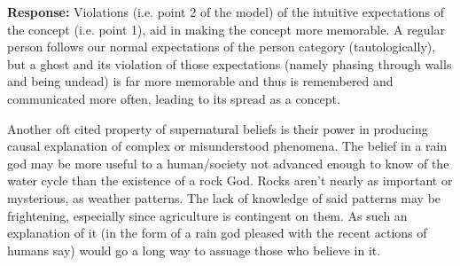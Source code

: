 \documentclass{article}
\begin{document}
\noindent\textbf{Response:} Violations (i.e. point 2 of the model) of the intuitive expectations of the concept (i.e. point 1), aid in making the concept more memorable. A regular person follows our normal expectations of the person category (tautologically), but a ghost and its violation of those expectations (namely phasing through walls and being undead) is far more memorable and thus is remembered and communicated more often, leading to its spread as a concept.

Another oft cited property of supernatural beliefs is their power in producing causal explanation of complex or misunderstood phenomena. The belief in a rain god may be more useful to a human/society not advanced enough to know of the water cycle than the existence of a rock God. Rocks aren't nearly as important or mysterious, as weather patterns. The lack of knowledge of said patterns may be frightening, especially since agriculture is contingent on them. As such an explanation of it (in the form of a rain god pleased with the recent actions of humans say) would go a long way to assuage those who believe in it.
\end{document}
